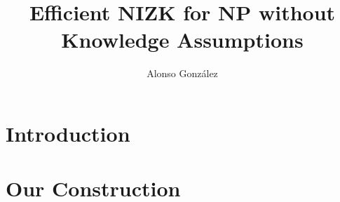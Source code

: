 \documentclass{llncs}
\author{Alonso Gonz\'alez \inst{1}}
\institute{Mi casita}
\title{Efficient NIZK for NP without Knowledge Assumptions}
\begin{document}

\maketitle
\begin{abstract}
    
\end{abstract} 

\section{Introduction}

    
        
    

        


\section{Our Construction}
    
	



\end{document}
